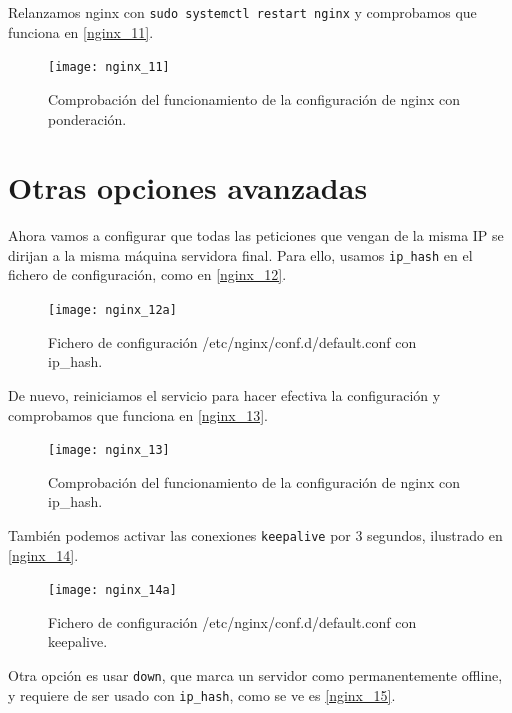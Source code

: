 Relanzamos nginx con \verb|sudo systemctl restart nginx| y comprobamos que funciona en \eqref{nginx_11}.

\begin{figure}[h!]
\begin{center}
\caption{Comprobación del funcionamiento de la configuración de nginx con ponderación.}
\label{nginx_11}
\texttt{[image: nginx\_11]}
\end{center}
\end{figure}

\section{Otras opciones avanzadas}

Ahora vamos a configurar que todas las peticiones que vengan de la misma IP se dirijan a la misma máquina servidora final. Para ello, usamos \verb|ip_hash| en el fichero de configuración, como en \eqref{nginx_12}.

\begin{figure}[h!]
\begin{center}
\caption{Fichero de configuración /etc/nginx/conf.d/default.conf con ip\_hash.}
\label{nginx_12}
\texttt{[image: nginx\_12a]}
\end{center}
\end{figure}

De nuevo, reiniciamos el servicio para hacer efectiva la configuración y comprobamos que funciona en \eqref{nginx_13}.

\begin{figure}[h!]
\begin{center}
\caption{Comprobación del funcionamiento de la configuración de nginx con ip\_hash.}
\label{nginx_13}
\texttt{[image: nginx\_13]}
\end{center}
\end{figure}

También podemos activar las conexiones \verb|keepalive| por 3 segundos, ilustrado en \eqref{nginx_14}.

\begin{figure}[h!]
\begin{center}
\caption{Fichero de configuración /etc/nginx/conf.d/default.conf con keepalive.}
\label{nginx_14}
\texttt{[image: nginx\_14a]}
\end{center}
\end{figure}

Otra opción es usar \verb|down|, que marca un servidor como permanentemente offline, y requiere de ser usado con \verb|ip_hash|, como se ve es \eqref{nginx_15}.

